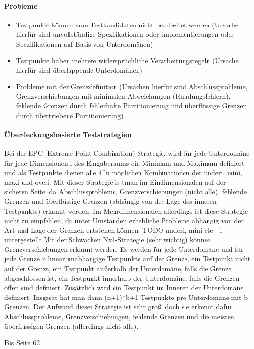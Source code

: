 \paragraph{Probleme}
\begin{itemize}
\item Testpunkte können vom Testkandidaten nicht bearbeitet werden (Ursache hierfür sind unvollständige Spezifikationen oder Implementierungen oder Spezifikationen auf Basis von Unterdomänen)
\item Testpunkte haben mehrere widersprüchliche Verarbeitungsregeln (Ursache hierfür sind überlappende Unterdomänen)
\item Probleme mit der Grenzdefinition (Ursachen hierfür sind Abschlussprobleme, Grenzverschiebungen mit minimalen Abweichungen (Rundungsfehlern), fehlende Grenzen durch fehlerhafte Partitionierung und überflüssige Grenzen durch übertriebene Partitionierung)
\end{itemize}

\paragraph{Überdeckungsbasierte Teststrategien}
Bei der EPC (Extreme Point Combination) Strategie, wird für jede Unterdomäne für jede Dimensionen i des Eingaberaums ein Minimum und Maximum definiert und als Testpunkte dienen alle 4^n möglichen Kombinationen der underi, mini, maxi und overi. 
Mit dieser Strategie is tman im Eindimensionalen auf der sicheren Seite, da Abschlussprobleme, Grenzverschiebungen (nicht alle), fehlende Grenzen und überflüssige Grenzen (abhängig von der Lage des inneren Testpunkts) erkannt werden. Im Mehrdimensionalen allerdings ist diese Strategie nicht zu empfehlen, da unter Umständen erhebliche Probleme abhängig von der Art und Lage der Grenzen entstehen können.
TODO underi, mini etc - i untergestellt
\linebreak
Mit der Schwachen Nx1-Strategie (sehr wichtig) können Grenzverschiebungen erkannt werden. Es werden für jede Unterdomäne und für jede Grenze n linear unabhängige Testpunkte auf der Grenze, ein Testpunkt nicht auf der Grenze, ein Testpunkt außerhalb der Unterdomäne, falls die Grenze abgeschlossen ist, ein Testpunkt innerhalb der Unterdomäne, falls die Grenzen offen sind definiert. Zusätzlich wird ein Testpunkt im Inneren der Unterdomäne definiert. Insgesat hat man dann (n+1)*b+1 Testpunkte pro Unterdomäne mit b Grenzen. Der Aufwand dieser Strategie ist sehr groß, doch sie erkennt dafür Abschlussprobleme, Grenzverschiebungen, fehlende Grenzen und die meisten überflüssigen Grenzen (allerdings nicht alle).

Bis Seite 62